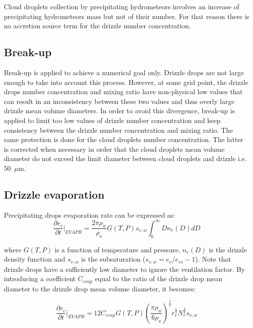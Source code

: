 \noindent Cloud droplets collection by precipitating hydrometeors involves an increase of precipitating hydrometeors mass but not of their number. For that reason there is no accretion source term for the drizzle number concentration.


\subsection{Break-up}

Break-up is applied to achieve a numerical goal only. Drizzle drops are not large enough to take into account this process. However, at some grid point, the drizzle drops number concentration and mixing ratio have non-physical low values that can result in an inconsistency between these two values and thus overly large drizzle mean volume diameters. In order to avoid this divergence, break-up is applied to limit too low values of drizzle number concentration and keep consistency between the drizzle number concentration and mixing ratio.
The same protection is done for the cloud droplets number concentration. The latter is corrected when necessary in order that the cloud droplets mean volume diameter do not exceed the limit diameter between cloud droplets and drizzle i.e. 50~$\mu$m.

\subsection{Drizzle evaporation}

Precipitating drops evaporation rate can be expressed as:
\begin{equation}
\frac{\displaystyle{\partial r_r}}{\displaystyle{\partial t}} \Big|_{EVAPR}=
\frac{2\pi\rho_w}{\rho_a}G(T,P) s_{v,w}\int_{0}^{\infty}Dn_r(D)dD
\end{equation}


\noindent where $G(T,P)$ is a function of temperature and pressure, $n_r(D)$ is the drizzle density function 
and $s_{v,w}$ is the subsaturation ($s_{v,w}=e_v/e_{vs}-1$). 
Note that drizzle drops have a sufficiently low diameter to ignore the ventilation factor. 
By introducing a coefficient $C_{evap}$ equal to the ratio of the drizzle drop mean diameter to the drizzle drop mean volume diameter, it becomes:

\begin{equation}
\frac{\displaystyle{\partial r_r}}{\displaystyle{\partial t}} \Big|_{EVAPR}=
12C_{evap}G(T,P)(\frac{\pi\rho_w}{6\rho_a})^{\frac{2}{3}}r_r^{\frac{1}{3}}N_r^{\frac{2}{3}}s_{v,w}
\end{equation}

